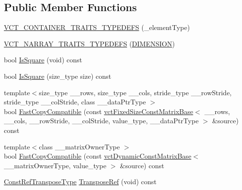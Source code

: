 \subsection*{Public Member Functions}
\begin{DoxyCompactItemize}
\item 
\hyperlink{classvct_fixed_size_const_matrix_base_a9689d334c93e1ff3dc68f22261889d6c}{V\+C\+T\+\_\+\+C\+O\+N\+T\+A\+I\+N\+E\+R\+\_\+\+T\+R\+A\+I\+T\+S\+\_\+\+T\+Y\+P\+E\+D\+E\+F\+S} (\+\_\+element\+Type)
\item 
\hyperlink{classvct_fixed_size_const_matrix_base_ab4f4b30b85de840a0ae41abb39f598de}{V\+C\+T\+\_\+\+N\+A\+R\+R\+A\+Y\+\_\+\+T\+R\+A\+I\+T\+S\+\_\+\+T\+Y\+P\+E\+D\+E\+F\+S} (\hyperlink{classvct_fixed_size_const_matrix_base_ab96748397b9d0700e8c892b7700c29b3a8f93683e9a4da14eb3a7005b19ad135f}{D\+I\+M\+E\+N\+S\+I\+O\+N})
\item 
bool \hyperlink{classvct_fixed_size_const_matrix_base_a895539d29d3fed780092490db3b99885}{Is\+Square} (void) const 
\item 
bool \hyperlink{classvct_fixed_size_const_matrix_base_a4b6ba47ff5a6995c4144a7b466058224}{Is\+Square} (size\+\_\+type size) const 
\item 
{\footnotesize template$<$size\+\_\+type \+\_\+\+\_\+rows, size\+\_\+type \+\_\+\+\_\+cols, stride\+\_\+type \+\_\+\+\_\+row\+Stride, stride\+\_\+type \+\_\+\+\_\+col\+Stride, class \+\_\+\+\_\+data\+Ptr\+Type $>$ }\\bool \hyperlink{classvct_fixed_size_const_matrix_base_aa0d994da3275ff6185ba37e16a6ba2e7}{Fast\+Copy\+Compatible} (const \hyperlink{classvct_fixed_size_const_matrix_base}{vct\+Fixed\+Size\+Const\+Matrix\+Base}$<$ \+\_\+\+\_\+rows, \+\_\+\+\_\+cols, \+\_\+\+\_\+row\+Stride, \+\_\+\+\_\+col\+Stride, value\+\_\+type, \+\_\+\+\_\+data\+Ptr\+Type $>$ \&source) const 
\item 
{\footnotesize template$<$class \+\_\+\+\_\+matrix\+Owner\+Type $>$ }\\bool \hyperlink{classvct_fixed_size_const_matrix_base_ad1a7a8dc7fbff508f7562c36b9660b89}{Fast\+Copy\+Compatible} (const \hyperlink{classvct_dynamic_const_matrix_base}{vct\+Dynamic\+Const\+Matrix\+Base}$<$ \+\_\+\+\_\+matrix\+Owner\+Type, value\+\_\+type $>$ \&source) const 
\item 
\hyperlink{classvct_fixed_size_const_matrix_base_a41d41a9a3dc6d0c8e36348a8c2fc83db}{Const\+Ref\+Transpose\+Type} \hyperlink{classvct_fixed_size_const_matrix_base_af8ce7322fff5aa54c0598938041a5096}{Transpose\+Ref} (void) const 
\item 

\end{DoxyCompactItemize}
